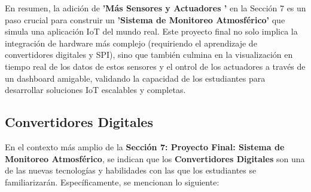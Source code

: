 \documentclass{report}
\begin{document}
En resumen, la adición de \textbf{ 'Más Sensores y Actuadores '} en la Sección 7 es un paso crucial para construir un \textbf{'Sistema de Monitoreo 
Atmosférico'} que simula una aplicación IoT del mundo real. Este proyecto final no solo implica la integración de hardware más complejo (requiriendo 
el aprendizaje de convertidores digitales y SPI), sino que también culmina en la visualización en tiempo real de los datos de estos sensores y el 
ontrol de los actuadores a través de un dashboard amigable, validando la capacidad de los estudiantes para desarrollar soluciones IoT escalables y completas.

\subsection{Convertidores Digitales}
En el contexto más amplio de la \textbf{Sección 7: Proyecto Final: Sistema de Monitoreo Atmosférico}, se  indican que los 
\textbf{Convertidores Digitales} son una de las nuevas tecnologías y habilidades con las que los estudiantes se familiarizarán. Específicamente, 
se  mencionan lo siguiente:
\end{document}
